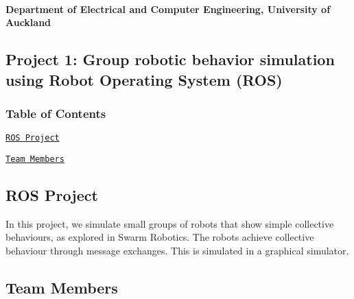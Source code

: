 \paragraph*{Department of Electrical and Computer Engineering, University of Auckland}

\subsection*{Project 1\-: Group robotic behavior simulation using Robot Operating System (R\-O\-S)}

\subsubsection*{Table of Contents}


\begin{DoxyItemize}
\item \href{#about}{\tt R\-O\-S Project}
\item \href{#team-members}{\tt Team Members}
\end{DoxyItemize}

\subsection*{\label{_about}%
R\-O\-S Project}

In this project, we simulate small groups of robots that show simple collective behaviours, as explored in Swarm Robotics. The robots achieve collective behaviour through message exchanges. This is simulated in a graphical simulator.

\subsection*{\label{_team-members}%
Team Members}

